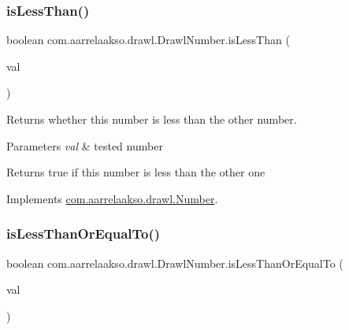 \subsubsection{\texorpdfstring{is\+Less\+Than()}{isLessThan()}\hspace{0.1cm}{\footnotesize\ttfamily [2/2]}}
{\footnotesize\ttfamily boolean com.\+aarrelaakso.\+drawl.\+Drawl\+Number.\+is\+Less\+Than (\begin{DoxyParamCaption}\item[{final double}]{val }\end{DoxyParamCaption})}



Returns whether this number is less than the other number. 


\begin{DoxyParams}{Parameters}
{\em val} & tested number \\
\hline
\end{DoxyParams}
\begin{DoxyReturn}{Returns}
true if this number is less than the other one 
\end{DoxyReturn}


Implements \hyperlink{interfacecom_1_1aarrelaakso_1_1drawl_1_1_number_a82b299428c48204fb05229dbea2b439b}{com.\+aarrelaakso.\+drawl.\+Number}.

\mbox{\label{classcom_1_1aarrelaakso_1_1drawl_1_1_drawl_number_af3936483f84eec933c41b7dc78bb473a}} 
\subsubsection{\texorpdfstring{is\+Less\+Than\+Or\+Equal\+To()}{isLessThanOrEqualTo()}\hspace{0.1cm}{\footnotesize\ttfamily [1/2]}}
{\footnotesize\ttfamily boolean com.\+aarrelaakso.\+drawl.\+Drawl\+Number.\+is\+Less\+Than\+Or\+Equal\+To (\begin{DoxyParamCaption}\item[{@Not\+Null final \hyperlink{interfacecom_1_1aarrelaakso_1_1drawl_1_1_number}{Number}}]{val }\end{DoxyParamCaption})}



